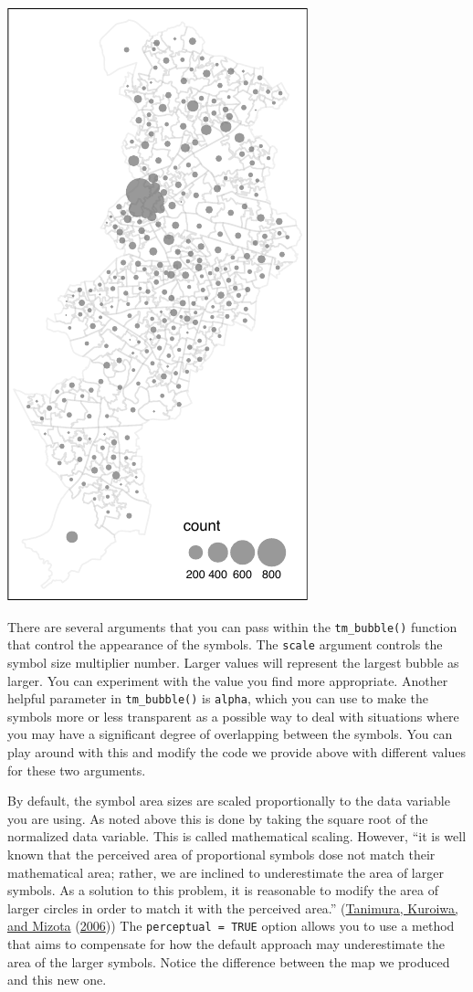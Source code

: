 \documentclass[
  krantz2]{krantz}
\begin{document}
\includegraphics{crime_mapping_files/figure-latex/unnamed-chunk-79-1.pdf}

There are several arguments that you can pass within the \texttt{tm\_bubble()} function that control the appearance of the symbols. The \texttt{scale} argument controls the symbol size multiplier number. Larger values will represent the largest bubble as larger. You can experiment with the value you find more appropriate. Another helpful parameter in \texttt{tm\_bubble()} is \texttt{alpha}, which you can use to make the symbols more or less transparent as a possible way to deal with situations where you may have a significant degree of overlapping between the symbols. You can play around with this and modify the code we provide above with different values for these two arguments.

By default, the symbol area sizes are scaled proportionally to the data variable you are using. As noted above this is done by taking the square root of the normalized data variable. This is called mathematical scaling. However, ``it is well known that the perceived area of proportional symbols dose not match their mathematical area; rather, we are inclined to underestimate the area of larger symbols. As a solution to this problem, it is reasonable to modify the area of larger circles in order to match it with the perceived area.'' (\protect\hyperlink{ref-Tanimura_2006}{Tanimura, Kuroiwa, and Mizota} (\protect\hyperlink{ref-Tanimura_2006}{2006})) The \texttt{perceptual\ =\ TRUE} option allows you to use a method that aims to compensate for how the default approach may underestimate the area of the larger symbols. Notice the difference between the map we produced and this new one.
\end{document}
